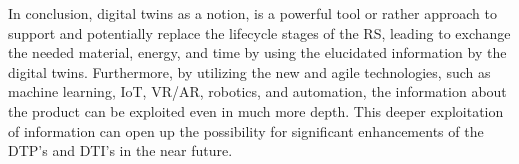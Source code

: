 \documentclass[conference]{IEEEtran}
\begin{document}
    In conclusion, digital twins as a notion, is a powerful tool or rather approach to support and potentially replace the lifecycle stages of the RS, 
    leading to exchange the needed material, energy, and time by using the elucidated information by the digital twins. Furthermore, 
    by utilizing the new and agile technologies, such as machine learning, IoT, VR/AR, robotics, and automation, the information about the product can be exploited even in much more depth. 
    This deeper exploitation of information can open up the possibility for significant enhancements of the DTP's and DTI's in the near future. 

    
    
    
\end{document}
